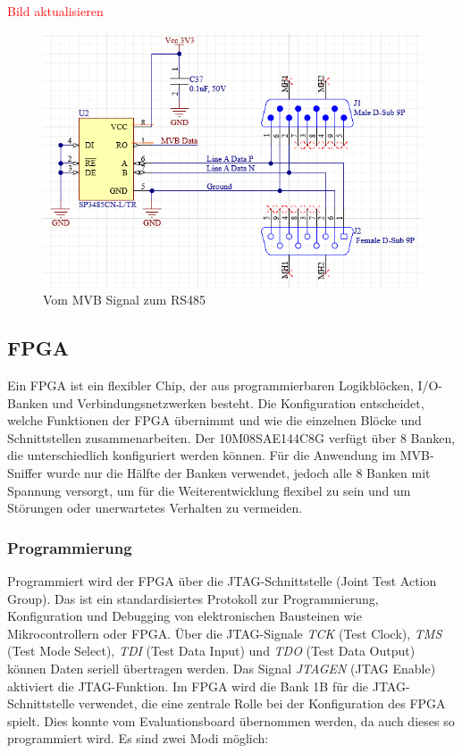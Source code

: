 \textcolor{red}{Bild aktualisieren}
\begin{figure}[H]
    \centering
    \includegraphics[width=0.8\linewidth]{Figures/Chap3/Schematics/MVB to RS485.png}
    \caption{Vom MVB Signal zum RS485}
    \label{fig:MVB to RS485}
\end{figure}


\subsection{FPGA}
Ein FPGA ist ein flexibler Chip, der aus programmierbaren Logikblöcken, I/O-Banken und Verbindungsnetzwerken besteht. Die Konfiguration entscheidet, welche Funktionen der FPGA übernimmt und wie die einzelnen Blöcke und Schnittstellen zusammenarbeiten. Der 10M08SAE144C8G verfügt über 8 Banken, die unterschiedlich konfiguriert werden können. Für die Anwendung im MVB-Sniffer wurde nur die Hälfte der Banken verwendet, jedoch alle 8 Banken mit Spannung versorgt, um für die Weiterentwicklung flexibel zu sein und um Störungen oder unerwartetes Verhalten zu vermeiden.


\subsubsection{Programmierung}

Programmiert wird der FPGA über die JTAG-Schnittstelle (Joint Test Action Group). Das ist ein standardisiertes Protokoll zur Programmierung, Konfiguration und Debugging von elektronischen Bausteinen wie Mikrocontrollern oder FPGA. Über die JTAG-Signale \textit{TCK} (Test Clock), \textit{TMS} (Test Mode Select), \textit{TDI} (Test Data Input) und \textit{TDO} (Test Data Output) können Daten seriell übertragen werden. Das Signal \textit{JTAGEN} (JTAG Enable) aktiviert die JTAG-Funktion. Im FPGA wird die Bank 1B für die JTAG-Schnittstelle verwendet, die eine zentrale Rolle bei der Konfiguration des FPGA spielt. Dies konnte vom Evaluationsboard übernommen werden, da auch dieses so programmiert wird. Es sind zwei Modi möglich:

